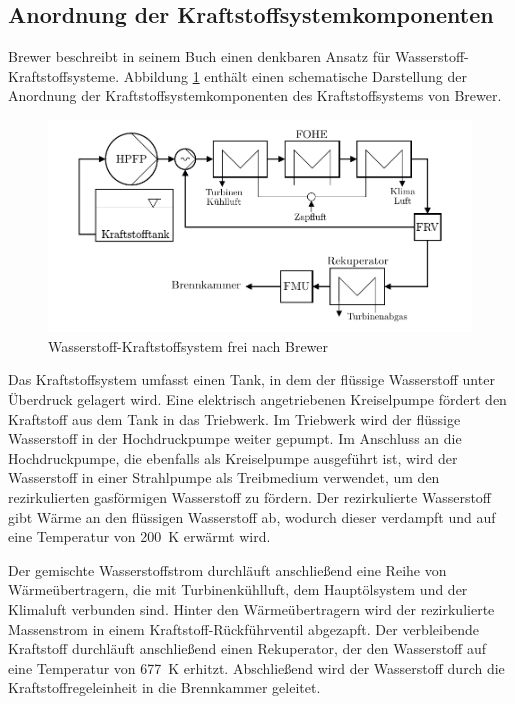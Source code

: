 \subsection{Anordnung der Kraftstoffsystemkomponenten}

Brewer \cite{Brewer.1991} beschreibt in seinem Buch einen denkbaren Ansatz für Wasserstoff-Kraftstoffsysteme. Abbildung \ref{fig:brewer} enthält einen schematische Darstellung der Anordnung der Kraftstoffsystemkomponenten des Kraftstoffsystems von Brewer.


\begin{figure}[ht]
\centering
\includegraphics[width=1\linewidth]{4_Abbildungen/2_Hauptteil/Kraftstoffsystem Abbildungen/brewer.pdf}
  \caption{Wasserstoff-Kraftstoffsystem frei nach Brewer \cite{Brewer.1991}}
  \label{fig:brewer}
\end{figure}
\FloatBarrier 

Das Kraftstoffsystem umfasst einen Tank, in dem der flüssige Wasserstoff unter Überdruck gelagert wird. Eine elektrisch angetriebenen Kreiselpumpe fördert den Kraftstoff aus dem Tank in das Triebwerk. Im Triebwerk wird der flüssige Wasserstoff in der Hochdruckpumpe weiter gepumpt. Im Anschluss an die Hochdruckpumpe, die ebenfalls als Kreiselpumpe ausgeführt ist, wird der Wasserstoff in einer Strahlpumpe als Treibmedium verwendet, um den rezirkulierten gasförmigen Wasserstoff zu fördern. Der rezirkulierte Wasserstoff gibt Wärme an den flüssigen Wasserstoff ab, wodurch dieser verdampft und auf eine Temperatur von \SI{200}{K} erwärmt wird. 

Der gemischte Wasserstoffstrom durchläuft anschließend eine Reihe von Wärmeübertragern, die mit Turbinenkühlluft, dem Hauptölsystem und der Klimaluft verbunden sind. Hinter den Wärmeübertragern wird der rezirkulierte Massenstrom in einem Kraftstoff-Rückführventil abgezapft. Der verbleibende Kraftstoff durchläuft anschließend einen Rekuperator, der den Wasserstoff auf eine Temperatur von \SI{677}{K} erhitzt. Abschließend wird der Wasserstoff durch die Kraftstoffregeleinheit in die Brennkammer geleitet.